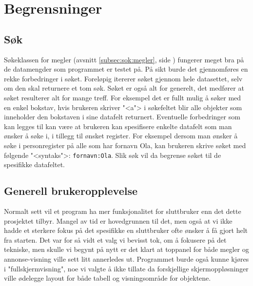 \section{Begrensninger}

\subsection{Søk} \label{subsec:begrensinger:sok}
Søkeklassen for megler (avsnitt \ref{subsec:sok:megler}, side \pageref{subsec:sok:megler}) fungerer meget bra på de datamengder som programmet er testet på. På sikt burde det gjennomføres en rekke forbedringer i søket. Foreløpig itererer søket gjennom hele datasettet, selv om den skal returnere et tom søk. Søket er også alt for generelt, det medfører at søket resulterer alt for mange treff. For eksempel det er fullt mulig å søker med en enkel bokstav, hvis brukeren skriver "<a"> i søkefeltet blir alle objekter som inneholder den bokstaven i sine datafelt returnert. Eventuelle forbedringer som kan legges til kan være at brukeren kan spesifisere enkelte datafelt som man ønsker å søke i, i tillegg til ønsket register. For eksempel dersom man ønsker å søke i personregister på alle som har fornavn Ola, kan brukeren skrive søket med følgende "<syntaks">: \texttt{fornavn:Ola}. Slik søk vil da begrense søket til de spesifikke datafeltet.

\subsection{Generell brukeropplevelse}
Normalt sett vil et program ha mer funksjonalitet for sluttbruker enn det dette prosjektet tilbyr. Mangel av tid er hovedgrunnen til det, men også at vi ikke hadde et sterkere fokus på det spesifikke en sluttbruker ofte ønsker å få gjort helt fra starten.
Det var for så vidt et valg vi bevisst tok, om å fokusere på det tekniske, men skulle vi begynt på nytt er det klart at toppanel for både megler og annonse-visning ville sett litt annerledes ut. Programmet burde også kunne kjøres i "fullskjermvisning", noe vi valgte å ikke tillate da forskjellige skjermoppløsninger ville ødelegge layout for både tabell og visningsområde for objektene.
